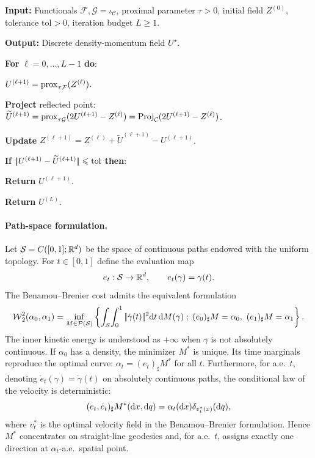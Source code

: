 \begin{alg}\label{alg:benamou-brenier-douglas-rachford}
\textbf{Input:} Functionals $\mathcal F,\mathcal G=\iota_{\mathcal C}$, proximal parameter $\tau>0$, initial field $Z^{(0)}$, tolerance $\mathrm{tol}>0$, iteration budget $L\geq1$.

\textbf{Output:} Discrete density-momentum field $U^\star$.

\textbf{For} $\ell=0,\ldots,L-1$ \textbf{do}:
\begin{algblock}
\(U^{(\ell+1)}=\operatorname{prox}_{\tau\mathcal F}(Z^{(\ell)})\).

\textbf{Project} reflected point:
\(\widetilde U^{(\ell+1)} = \operatorname{prox}_{\tau\mathcal G}(2U^{(\ell+1)}-Z^{(\ell)}) = \operatorname{Proj}_{\mathcal C}(2U^{(\ell+1)}-Z^{(\ell)})\).

\textbf{Update}
\(Z^{(\ell+1)}=Z^{(\ell)}+\widetilde U^{(\ell+1)}-U^{(\ell+1)}\).

\textbf{If} $|\!| U^{(\ell+1)}-\widetilde U^{(\ell+1)} |\!|\leqslant\mathrm{tol}$ \textbf{then}:
\begin{algblock}
\textbf{Return} $U^{(\ell+1)}$.
\end{algblock}
\end{algblock}

\textbf{Return} $U^{(L)}$.
\end{alg}

\paragraph{Path-space formulation.}\label{rem-bb-path-space}
	Let $\mathcal{S}=C([0,1];\mathbb{R}^d)$ be the space of continuous paths endowed with the uniform topology. For $t\in[0,1]$ define the evaluation map
	\[
		e_t:\mathcal{S}\to\mathbb{R}^d,
		\qquad
		e_t(\gamma)=\gamma(t).
	\]
	The Benamou--Brenier cost admits the equivalent formulation
	\[
		\operatorname{\mathcal{W}}_2^2(\alpha_0,\alpha_1)
		=
		\inf_{M\in\mathcal{P}(\mathcal{S})}
		\left\{ 
			\int_{\mathcal{S}}\!\int_0^1|\!| \dot\gamma(t) |\!|^2\mathrm{d} t\,\mathrm{d} M(\gamma)
		 \;;\; 
			(e_0)_\sharp M=\alpha_0,\ (e_1)_\sharp M=\alpha_1
		 \right\}.
	\]
	The inner kinetic energy is understood as $+\infty$ when $\gamma$ is not absolutely continuous. If $\alpha_0$ has a density, the minimizer $M^*$ is unique. Its time marginals reproduce the optimal curve: $\alpha_t=(e_t)_\sharp M^*$ for all $t$. Furthermore, for a.e.\ $t$, denoting $\dot e_t(\gamma)=\dot\gamma(t)$ on absolutely continuous paths, the conditional law of the velocity is deterministic:
	\[
		(e_t,\dot e_t)_\sharp M^*(\mathrm{d} x,\mathrm{d} q)
		=
		\alpha_t(\mathrm{d} x)\delta_{v_t^*(x)}(\mathrm{d} q),
	\]
	where $v_t^*$ is the optimal velocity field in the Benamou--Brenier formulation. Hence $M^*$ concentrates on straight-line geodesics and, for a.e.\ $t$, assigns exactly one direction at $\alpha_t$-a.e.\ spatial point.

